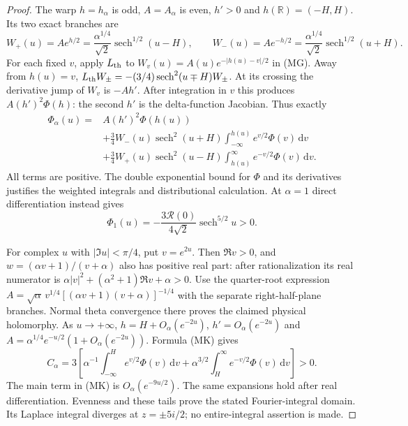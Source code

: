 \documentclass[11pt]{article}
\theoremstyle{remark}\newtheorem{remark}[theorem]{Remark}
\newcommand{\R}{\mathbb R}
\newcommand{\dd}{\,\mathrm d}
\begin{document}
\begin{proof}
The warp $h=h_\alpha$ is odd, $A=A_\alpha$ is even,
$h'>0$ and $h(\R)=(-H,H)$. Its two exact branches are
\[
 W_+(u)=Ae^{h/2}=\frac{\alpha^{1/4}}{\sqrt2}
                  \operatorname{sech}^{1/2}(u-H),\qquad
 W_-(u)=Ae^{-h/2}=\frac{\alpha^{1/4}}{\sqrt2}
                  \operatorname{sech}^{1/2}(u+H).
\]
For each fixed $v$, apply $L_{\rm th}$ to
$W_v(u)=A(u)e^{-|h(u)-v|/2}$ in (MG).
Away from $h(u)=v$,
$L_{\rm th}W_\pm=-(3/4)\operatorname{sech}^2(u\mp H)W_\pm$.
At its crossing the derivative jump of $W_v$ is $-Ah'$.
After integration in $v$ this produces $A(h')^2\Phi(h)$:
the second $h'$ is the delta-function Jacobian. Thus exactly
\[
\begin{split}
 \Phi_\alpha(u)={}&A(h')^2\Phi(h(u))\\
 &+\tfrac34 W_-(u)\operatorname{sech}^2(u+H)
                  \int_{-\infty}^{h(u)}e^{v/2}\Phi(v)\dd v\\
 &+\tfrac34 W_+(u)\operatorname{sech}^2(u-H)
                  \int_{h(u)}^\infty e^{-v/2}\Phi(v)\dd v.
\end{split} \tag{MK}
\]
All terms are positive. The double exponential bound for $\Phi$ and
its derivatives justifies the weighted integrals and distributional
calculation. At $\alpha=1$ direct differentiation instead gives
\[
 \Phi_1(u)=-\frac{3\mathcal R(0)}{4\sqrt2}
                             \operatorname{sech}^{5/2}u>0.
\]

For complex $u$ with $|\Im u|<\pi/4$, put $v=e^{2u}$.
Then $\Re v>0$, and
$w=(\alpha v+1)/(v+\alpha)$ also has positive real part: after
rationalization its real numerator is
$\alpha|v|^2+(\alpha^2+1)\Re v+\alpha>0$.
Use the quarter-root expression
$A=\sqrt\alpha\,v^{1/4}[(\alpha v+1)(v+\alpha)]^{-1/4}$
with the separate right-half-plane branches. Normal theta convergence
there proves the claimed physical holomorphy.
As $u\to+\infty$, $h=H+O_\alpha(e^{-2u})$,
$h'=O_\alpha(e^{-2u})$ and
$A=\alpha^{1/4}e^{-u/2}(1+O_\alpha(e^{-2u}))$.
Formula (MK) gives
\[
 C_\alpha=3\left[
 \alpha^{-1}\int_{-\infty}^{H}e^{v/2}\Phi(v)\dd v
 +\alpha^{3/2}\int_H^\infty e^{-v/2}\Phi(v)\dd v\right]>0.
\]
The main term in (MK) is $O_\alpha(e^{-9u/2})$.
The same expansions hold after real differentiation. Evenness and
these tails prove the stated Fourier-integral domain. Its Laplace
integral diverges at $z=\pm5i/2$; no entire-integral assertion is made.


\end{proof}
\end{document}
